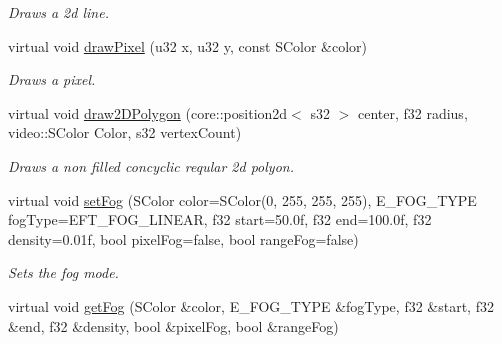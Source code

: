 \begin{DoxyCompactItemize}
\begin{DoxyCompactList}\small\item\em Draws a 2d line. \end{DoxyCompactList}\item 
\hypertarget{classirr_1_1video_1_1_c_null_driver_ac5158df0926f0d36da4f2ec96ad12569}{virtual void \hyperlink{classirr_1_1video_1_1_c_null_driver_ac5158df0926f0d36da4f2ec96ad12569}{draw\-Pixel} (u32 x, u32 y, const S\-Color \&color)}\label{classirr_1_1video_1_1_c_null_driver_ac5158df0926f0d36da4f2ec96ad12569}

\begin{DoxyCompactList}\small\item\em Draws a pixel. \end{DoxyCompactList}\item 
virtual void \hyperlink{classirr_1_1video_1_1_c_null_driver_a2db7156fdab41b6e9fee705541c76665}{draw2\-D\-Polygon} (core\-::position2d$<$ s32 $>$ center, f32 radius, video\-::\-S\-Color Color, s32 vertex\-Count)
\begin{DoxyCompactList}\small\item\em Draws a non filled concyclic reqular 2d polyon. \end{DoxyCompactList}\item 
\hypertarget{classirr_1_1video_1_1_c_null_driver_a084ab36c15e71277dce44b5fabc867b0}{virtual void \hyperlink{classirr_1_1video_1_1_c_null_driver_a084ab36c15e71277dce44b5fabc867b0}{set\-Fog} (S\-Color color=S\-Color(0, 255, 255, 255), E\-\_\-\-F\-O\-G\-\_\-\-T\-Y\-P\-E fog\-Type=E\-F\-T\-\_\-\-F\-O\-G\-\_\-\-L\-I\-N\-E\-A\-R, f32 start=50.\-0f, f32 end=100.\-0f, f32 density=0.\-01f, bool pixel\-Fog=false, bool range\-Fog=false)}\label{classirr_1_1video_1_1_c_null_driver_a084ab36c15e71277dce44b5fabc867b0}

\begin{DoxyCompactList}\small\item\em Sets the fog mode. \end{DoxyCompactList}\item 
\hypertarget{classirr_1_1video_1_1_c_null_driver_a992756aab24c18ca895ea853e339c615}{virtual void \hyperlink{classirr_1_1video_1_1_c_null_driver_a992756aab24c18ca895ea853e339c615}{get\-Fog} (S\-Color \&color, E\-\_\-\-F\-O\-G\-\_\-\-T\-Y\-P\-E \&fog\-Type, f32 \&start, f32 \&end, f32 \&density, bool \&pixel\-Fog, bool \&range\-Fog)}\label{classirr_1_1video_1_1_c_null_driver_a992756aab24c18ca895ea853e339c615}


\end{DoxyCompactItemize}
